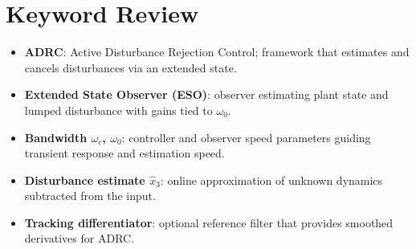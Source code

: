 \section{Keyword Review}
\begin{vocabulary}
\begin{itemize}[leftmargin=*]
    \item \textbf{ADRC}: Active Disturbance Rejection Control; framework that estimates and cancels disturbances via an extended state.
    \item \textbf{Extended State Observer (ESO)}: observer estimating plant state and lumped disturbance with gains tied to $\omega_0$.
    \item \textbf{Bandwidth $\omega_c$, $\omega_0$}: controller and observer speed parameters guiding transient response and estimation speed.
    \item \textbf{Disturbance estimate $\hat{x}_3$}: online approximation of unknown dynamics subtracted from the input.
    \item \textbf{Tracking differentiator}: optional reference filter that provides smoothed derivatives for ADRC.
\end{itemize}
\end{vocabulary}
